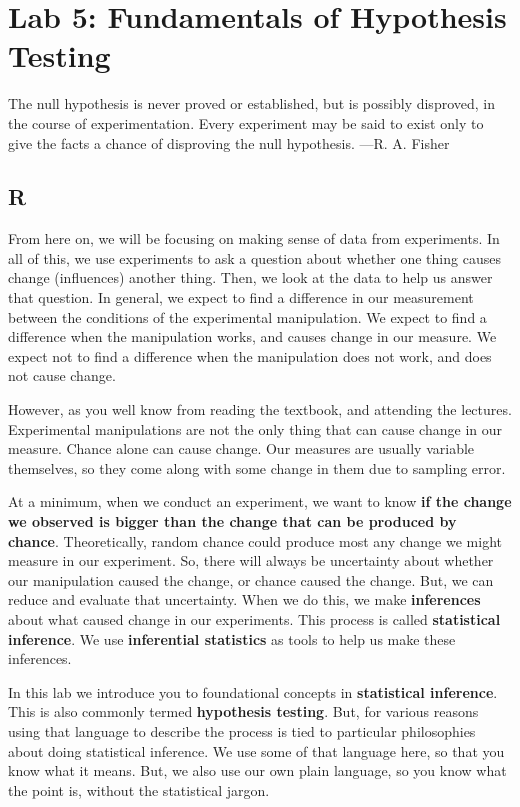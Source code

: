 \documentclass[]{book}
\begin{document}
\chapter{Lab 5: Fundamentals of Hypothesis
Testing}\label{lab-5-fundamentals-of-hypothesis-testing}

{ The null hypothesis is never proved or established, but is possibly
disproved, in the course of experimentation. Every experiment may be
said to exist only to give the facts a chance of disproving the null
hypothesis. ---R. A. Fisher }

\section{R}\label{r-5}

From here on, we will be focusing on making sense of data from
experiments. In all of this, we use experiments to ask a question about
whether one thing causes change (influences) another thing. Then, we
look at the data to help us answer that question. In general, we expect
to find a difference in our measurement between the conditions of the
experimental manipulation. We expect to find a difference when the
manipulation works, and causes change in our measure. We expect not to
find a difference when the manipulation does not work, and does not
cause change.

However, as you well know from reading the textbook, and attending the
lectures. Experimental manipulations are not the only thing that can
cause change in our measure. Chance alone can cause change. Our measures
are usually variable themselves, so they come along with some change in
them due to sampling error.

At a minimum, when we conduct an experiment, we want to know \textbf{if
the change we observed is bigger than the change that can be produced by
chance}. Theoretically, random chance could produce most any change we
might measure in our experiment. So, there will always be uncertainty
about whether our manipulation caused the change, or chance caused the
change. But, we can reduce and evaluate that uncertainty. When we do
this, we make \textbf{inferences} about what caused change in our
experiments. This process is called \textbf{statistical inference}. We
use \textbf{inferential statistics} as tools to help us make these
inferences.

In this lab we introduce you to foundational concepts in
\textbf{statistical inference}. This is also commonly termed
\textbf{hypothesis testing}. But, for various reasons using that
language to describe the process is tied to particular philosophies
about doing statistical inference. We use some of that language here, so
that you know what it means. But, we also use our own plain language, so
you know what the point is, without the statistical jargon.
\end{document}
